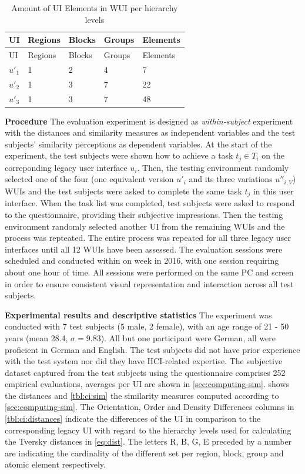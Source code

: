 \hypertarget{tbl:ci:hierarchy}{}
\begin{longtable}[]{@{}lllll@{}}
\caption{\label{tbl:ci:hierarchy}Amount of UI Elements in WUI per hierarchy levels}\tabularnewline
\toprule
UI & Regions & Blocks & Groups & Elements\tabularnewline
\midrule
\endfirsthead
\toprule
UI & Regions & Blocks & Groups & Elements\tabularnewline
\midrule
\endhead
\(u'_1\) & 1 & 2 & 4 & 7\tabularnewline
\(u'_2\) & 1 & 3 & 7 & 22\tabularnewline
\(u'_3\) & 1 & 3 & 7 & 48\tabularnewline
\bottomrule
\end{longtable}

\textbf{Procedure} The evaluation experiment is designed as \emph{within-subject} experiment with the distances and similarity measures as independent variables and the test subjects' similarity perceptions as dependent variables.
At the start of the experiment, the test subjects were shown how to achieve a task \(t_j \in T_i\) on the correponding legacy user interface \(u_i\).
Then, the testing environment randomly selected one of the four (one equivalent version \(u'_i\) and its three variations \(u''_{i,V}\)) WUIs and the test subjects were asked to complete the same task \(t_j\) in this user interface.
When the task list was completed, test subjects were asked to respond to the questionnaire, providing their subjective impressions.
Then the testing environment randomly selected another UI from the remaining WUIs and the process was repteated.
The entire process was repeated for all three legacy user interfaces until all 12 WUIs have been assessed.
The evaluation sessions were scheduled and conducted within on week in 2016, with one session requiring about one hour of time.
All sessions were performed on the same PC and screen in order to ensure consistent visual representation and interaction across all test subjects.

\textbf{Experimental results and descriptive statistics}
The experiment was conducted with 7 test subjects (5 male, 2 female), with an age range of 21 - 50 years (mean 28.4, \(\sigma = 9.83\)).
All but one participant were German, all were proficient in German and English.
The test subjects did not have prior experience with the test system nor did they have HCI-related expertise.
The subjective dataset captured from the test subjects using the questionnaire comprises 252 empirical evaluations, averages per UI are shown in \cref{sec:computing-sim}.
 shows the distances and \cref{tbl:ci:sim} the similarity measures computed according to \cref{sec:computing-sim}.
The Orientation, Order and Density Differences columns in \cref{tbl:ci:distances} indicate the differences of the UI in comparison to the corresponding legacy UI with regard to the hierarchy levels used for calculating the Tversky distances in \cref{eq:dist}.
The letters R, B, G, E preceded by a number are indicating the cardinality of the \(\text{different}\) set per region, block, group and atomic element respectively.


